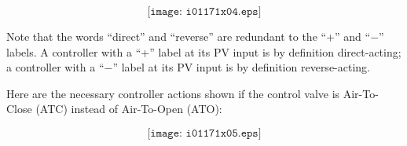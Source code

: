 





$$\texttt{[image: i01171x04.eps]}$$

Note that the words ``direct'' and ``reverse'' are redundant to the ``+'' and ``$-$'' labels.  A controller with a ``+'' label at its PV input is by definition direct-acting; a controller with a ``$-$'' label at its PV input is by definition reverse-acting.
 






Here are the necessary controller actions shown if the control valve is Air-To-Close (ATC) instead of Air-To-Open (ATO):

$$\texttt{[image: i01171x05.eps]}$$





